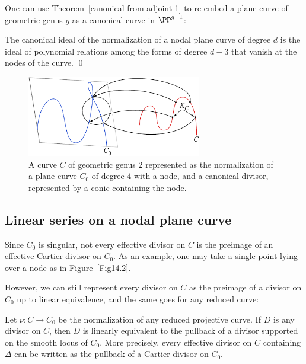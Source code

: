 One can use Theorem~\ref{canonical from adjoint 1} to re-embed a plane
curve of
geometric genus $g$ as a
canonical curve
%
in $\PP^{g-1}$:

\begin{corollary}
 The canonical ideal of the normalization of a nodal plane curve of
 degree $d$ is the ideal of polynomial relations
 among the forms of degree $d-3$ that vanish at the nodes of the
 curve. \qed
\end{corollary}

\begin{figure}
\centerline {\includegraphics[width=3in]{"main/Fig14-2"}}
\caption{A curve $C$ of geometric genus 2 represented as the normalization
of a plane curve $C_{0}$ of degree 4 with a node, and a canonical divisor,
represented by a conic containing the node.}
\label{canonical on normalization}
\end{figure}

\subsection{Linear series on a nodal plane curve}
\label{linear series on nodal plane curves}

Since $C_{0}$ is singular, not every
effective divisor
%
on $C$ is the
%
preimage of an
effective Cartier divisor on $C_{0}$. As an example, one may take a
single point lying over a node
as in Figure~\ref{Fig14.2}.

However,
we can still represent every divisor on $C$ as the preimage of a divisor
on $C_{0}$ up to linear
equivalence, and the same goes for any reduced curve:

\begin{lemma}
Let $\nu: C\to C_{0}$ be the normalization of any reduced projective
%
curve. If $D$ is any divisor
on $C$, then $D$ is linearly equivalent to the pullback of a divisor
supported on the smooth locus of  $C_{0}$. More precisely,  every
effective divisor on $C$ containing $\Delta$ can be written as the
pullback
of a
Cartier divisor
%
on $C_{0}$.
\unif
\end{lemma}

